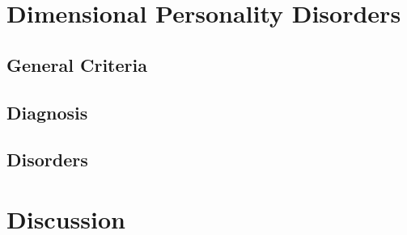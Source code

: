\documentclass[xcolor=x11names,compress]{beamer}\usepackage[]{graphicx}\usepackage[]{color}
\renewcommand{\(}{\begin{columns}}
\renewcommand{\)}{\end{columns}}
\newcommand{\<}[1]{\begin{column}{#1}}
\renewcommand{\>}{\end{column}}
\begin{document}






\section{Dimensional Personality Disorders}
\subsection{General Criteria}


\subsection{Diagnosis}


\subsection{Disorders}


\section{Discussion}

\end{document}
